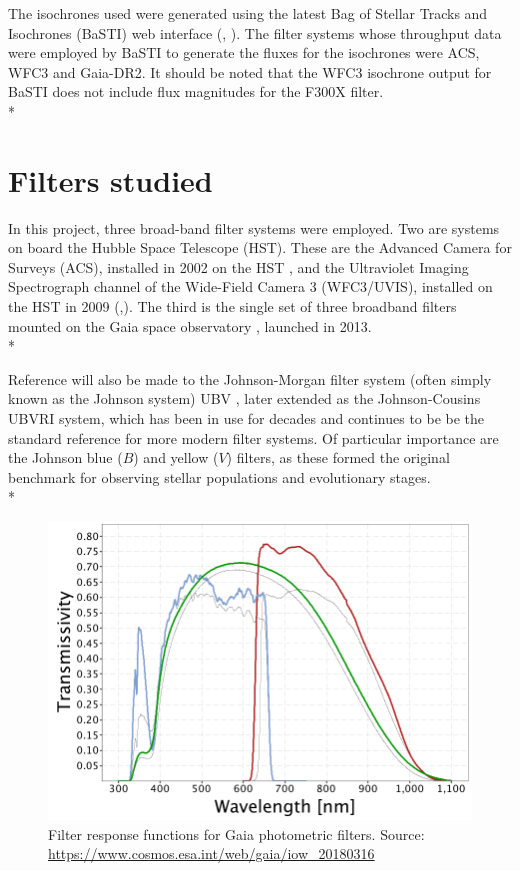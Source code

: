 \documentclass[12pt, a4paper]{report}
\begin{document}
The isochrones used were generated using the latest Bag of Stellar Tracks and Isochrones (BaSTI) web interface (\cite{2004ApJ...612..168P}, \cite{2018ApJ...856..125H}). The filter systems whose throughput data were employed by BaSTI to generate the fluxes for the isochrones were ACS, WFC3 and Gaia-DR2. It should be noted that the WFC3 isochrone output for BaSTI does not include flux magnitudes for the F300X filter.\\*

\section{Filters studied} \label{filter_desc}
In this project, three broad-band filter systems were employed. Two are systems on board the Hubble Space Telescope (HST). These are the Advanced Camera for Surveys (ACS), installed in 2002 on the HST \citep{2007AJ....133.1658S}, and the Ultraviolet Imaging Spectrograph channel of the Wide-Field Camera 3 (WFC3/UVIS), installed on the HST in 2009 (\cite{2010wfc..rept...14K},\cite{2010SPIE.7731E..0ZM}). The third is the single set of three broadband filters mounted on the Gaia space observatory  \citep{2010A&A...523A..48J}, launched in 2013. \\*

Reference will also be made to the Johnson-Morgan filter system (often simply known as the Johnson system) UBV \cite{1953ApJ...117..313J}, later extended as the Johnson-Cousins UBVRI \cite{1990PASP..102.1181B} system, which has been in use for decades and continues to be be the standard reference for more modern filter systems. Of particular importance are the Johnson blue ($B$) and yellow ($V$) filters, as these formed the original benchmark for observing stellar populations and evolutionary stages. \\*

\begin{figure}[h!]
\begin{center}
\includegraphics[width=1.0\textwidth]{GaiaDR2Passbands.png}
\caption{Filter response functions for Gaia photometric filters. Source: \protect\url{https://www.cosmos.esa.int/web/gaia/iow_20180316}}
\label{Gaia_response_funcs}
\end{center}
\end{figure}
\end{document}

